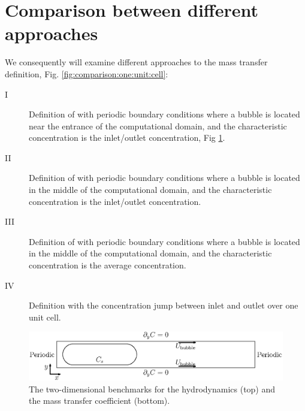 \documentclass{article}
\begin{document}
\section{Comparison between different approaches}
We consequently will examine different approaches to the mass transfer definition, Fig.
\ref{fig:comparison:one:unit:cell}:
\begin{description}
\item[I] Definition of \citet{vanbaten-circular} with periodic boundary conditions where a bubble
is located near the entrance of the computational domain, and the characteristic concentration is
the inlet/outlet concentration, Fig \ref{fig:benchmark}. 
\item[II] Definition of \citet{vanbaten-circular} with periodic boundary conditions where a
bubble is located in the middle of the computational domain, and the characteristic concentration
is the inlet/outlet concentration.
\item[III] Definition of \citet{vanbaten-circular} with periodic boundary conditions where a bubble
is located in the middle of the computational domain, and the characteristic concentration is the
average concentration.
\item[IV] Definition with the concentration jump between inlet and outlet over one unit cell.
\end{description}
\begin{figure}[htb!]
\includegraphics[width=\textwidth]{Figures/benchmark_periodic.eps}
\caption{The two-dimensional benchmarks for the hydrodynamics (top) and the mass transfer
coefficient (bottom). \label{fig:benchmark}}
\end{figure}
\end{document}
